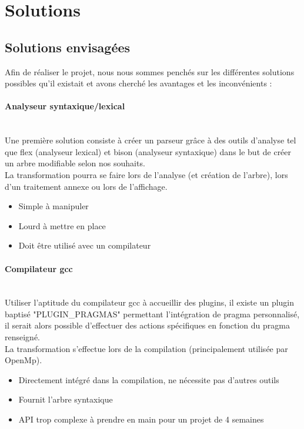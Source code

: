\documentclass{article}
\begin{document}
	\newpage	
	
	\section{Solutions}
	

	\subsection{Solutions envisagées}
	



	Afin de réaliser le projet, nous nous sommes penchés sur les différentes solutions possibles qu'il existait et avons cherché les avantages et les inconvénients :
	
	\paragraph{Analyseur syntaxique/lexical}
	~~\\
	\indent
	Une première solution consiste à créer un parseur grâce à des outils d'analyse tel que flex (analyseur lexical) et bison (analyseur syntaxique) dans le but de créer un arbre modifiable selon nos souhaits.\\
	La transformation pourra se faire lors de l'analyse (et création de l'arbre), lors d'un traitement annexe ou lors de l'affichage.\\
	\begin{itemize}
		\item Simple à manipuler
		\item Lourd à mettre en place
		\item Doit être utilisé avec un compilateur
	\end{itemize}
	
	\paragraph{Compilateur gcc}
		~~\\
	\indent
	Utiliser l'aptitude du compilateur gcc à accueillir des plugins, il existe un plugin baptisé "PLUGIN\_PRAGMAS" permettant l'intégration de pragma personnalisé, il serait alors possible d'effectuer des actions spécifiques en fonction du pragma renseigné.\\ La transformation s'effectue lors de la compilation (principalement utilisée par OpenMp). \\
	\begin{itemize}
		\item Directement intégré dans la compilation, ne nécessite pas d'autres outils
		\item Fournit l'arbre syntaxique
		\item API trop complexe à prendre en main pour un projet de 4 semaines
	\end{itemize}
	
\end{document}
